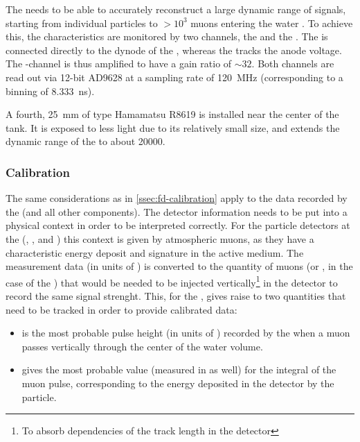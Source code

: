 The \WCD needs to be able to accurately reconstruct a large dynamic range of
signals, starting from individual particles to $>10^3$ muons entering the water
\cite{abrahamTriggerApertureSurface2010a}. To achieve this, the \LPMTs 
characteristics are monitored by two channels, the \HG and the \LG. The \LG 
is connected directly to the dynode of the \PMTs, whereas the \HG tracks the 
anode voltage. The \HG-channel is thus amplified to have a gain ratio of 
$\sim32$. Both channels are read out via 12-bit AD9628 \FADCs 
\cite{analogdevicesinc.AD9628DatasheetProduct2015} at a sampling rate of \SI{120}{\mega\hertz} (corresponding to a binning of \SI{8.333}{\nano\second}). 

A fourth, \SI{25}{\milli\meter} \SPMT of type Hamamatsu R8619 
\cite{hamamatsuphotonicsPhotomultiplierTubeR8619} is installed near the center
of the tank. It is exposed to less light due to its relatively small size, and 
extends the dynamic range of the \WCD to about \SI{20000}{\VEM}.

\subsubsection{Calibration}

The same considerations as in \cref{ssec:fd-calibration} apply to the data
recorded by the \WCD (and all other \SD components). The detector information 
needs to be put into a physical context in order to be interpreted correctly.
For the particle detectors at the \PAO (\WCD, \SSD, and \UMD) this context is 
given by atmospheric muons, as they have a characteristic energy deposit and 
signature in the active medium. The measurement data (in units of \ADC) is
converted to the quantity of muons (or \MIPs, in the case of the \SSD) that
would be needed to be injected vertically\footnote{To absorb dependencies of the
track length in the detector} in the detector to record the same signal 
strenght. This, for the \WCD, gives raise to two quantities that need to be 
tracked in order to provide calibrated data:

\begin{itemize}
	\item \Ivem is the most probable pulse height (in units of \ADC) 
	recorded by the \WCD \PMTs when a muon passes vertically through the 
	center of the water volume.
	\item \Qvem gives the most probable value (measured in \ADC as well) for
	the integral of the muon pulse, corresponding to the energy deposited in 	the detector by the particle.
\end{itemize}


